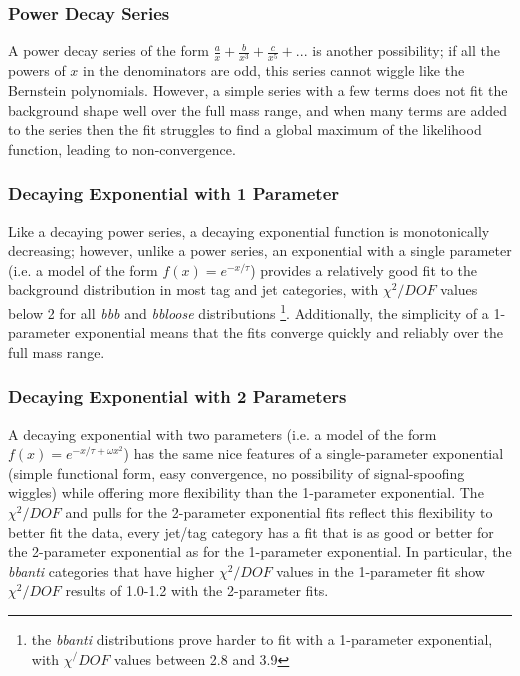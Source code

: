 \subsubsection{Power Decay Series}
A power decay series of the form $\frac{a}{x} + \frac{b}{x^3} + \frac{c}{x^5} + ...$
is another possibility; if all the powers of $x$ in the denominators are
odd, this series cannot wiggle like the Bernstein polynomials.  However,
a simple series with a few terms does not fit the background shape well 
over the full mass range, and when many terms are added to the series then
the fit struggles to find a global maximum of the likelihood function, leading
to non-convergence.

\subsubsection{Decaying Exponential with 1 Parameter}
Like a decaying power series, a decaying exponential function is monotonically
decreasing; however, unlike a power series, an exponential with a single
parameter (i.e. a model of the form $f(x)=e^{-x/\tau}$) provides 
a relatively good fit to the background distribution in most tag and jet
categories, with $\chi^2/DOF$ values below 2 for all \textit{bbb} and \textit{bbloose}
distributions \footnote{the \textit{bbanti} distributions prove harder to
fit with a 1-parameter exponential, with $\chi^/DOF$ values between 2.8 and 3.9}.
Additionally, the simplicity of a 1-parameter exponential means that the
fits converge quickly and reliably over the full mass range.

\subsubsection{Decaying Exponential with 2 Parameters}
A decaying exponential with two parameters (i.e. a model of the form $f(x)=e^{-x/\tau+\omega x^2}$)
has the same nice features of a single-parameter exponential (simple functional
form, easy convergence, no possibility of signal-spoofing wiggles) while offering
more flexibility than the 1-parameter exponential.  The $\chi^2/DOF$ and pulls
for the 2-parameter exponential fits reflect this flexibility to better
fit the data, every jet/tag category has a fit that is as good or better
for the 2-parameter exponential as for the 1-parameter exponential.  In 
particular, the \textit{bbanti} categories that have higher $\chi^2/DOF$ values
in the 1-parameter fit show $\chi^2/DOF$ results of 1.0-1.2 with the 2-parameter fits. 



